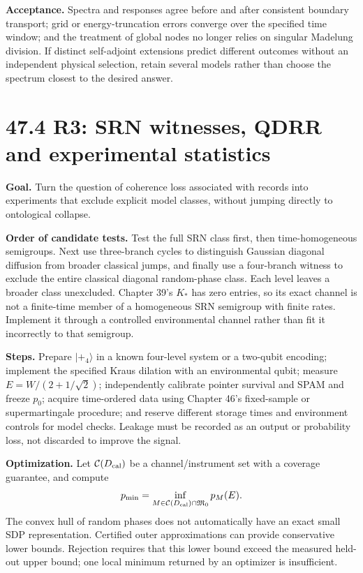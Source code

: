 \documentclass[
  11pt,
  oneside]{book}
\begin{document}
\textbf{Acceptance.} Spectra and responses agree before and after
consistent boundary transport; grid or energy-truncation errors converge
over the specified time window; and the treatment of global nodes no
longer relies on singular Madelung division. If distinct self-adjoint
extensions predict different outcomes without an independent physical
selection, retain several models rather than choose the spectrum closest
to the desired answer.

\section{47.4 R3: SRN witnesses, QDRR and experimental statistics}

\textbf{Goal.} Turn the question of coherence loss associated with
records into experiments that exclude explicit model classes, without
jumping directly to ontological collapse.

\textbf{Order of candidate tests.} Test the full SRN class first, then
time-homogeneous semigroups. Next use three-branch cycles to distinguish
Gaussian diagonal diffusion from broader classical jumps, and finally
use a four-branch witness to exclude the entire classical diagonal
random-phase class. Each level leaves a broader class unexcluded.
Chapter 39's \(K_*\) has zero entries, so its exact channel is not a
finite-time member of a homogeneous SRN semigroup with finite rates.
Implement it through a controlled environmental channel rather than fit
it incorrectly to that semigroup.

\textbf{Steps.} Prepare \(|+_4\rangle\) in a known four-level system or
a two-qubit encoding; implement the specified Kraus dilation with an
environmental qubit; measure \(E=W/(2+1/\sqrt2)\); independently
calibrate pointer survival and SPAM and freeze \(p_0\); acquire
time-ordered data using Chapter 46's fixed-sample or supermartingale
procedure; and reserve different storage times and environment controls
for model checks. Leakage must be recorded as an output or probability
loss, not discarded to improve the signal.

\textbf{Optimization.} Let \(\mathcal C(D_{\rm cal})\) be a
channel/instrument set with a coverage guarantee, and compute \[
p_{\min}=\inf_{M\in\mathcal C(D_{\rm cal})\cap\mathfrak M_0}p_M(E).
\] The convex hull of random phases does not automatically have an exact
small SDP representation. Certified outer approximations can provide
conservative lower bounds. Rejection requires that this lower bound
exceed the measured held-out upper bound; one local minimum returned by
an optimizer is insufficient.
\end{document}
